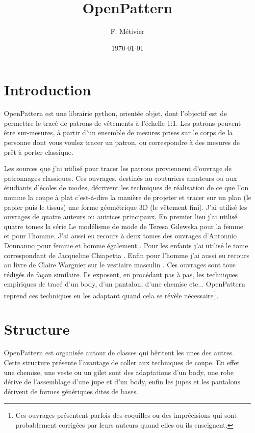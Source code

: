 \documentclass[11pt,a4paper]{article}
\begin{document}
\title{OpenPattern}
\author{F. Métivier}
\date{\today}
\maketitle

\tableofcontents


\section{Introduction}

OpenPattern  est une librairie python, orientée objet,  dont l'objectif est de permettre le tracé de patrons de vêtements à l'échelle 1:1. 
Les patrons peuvent être sur-mesures, à  partir d'un ensemble de mesures prises sur le corps de la personne dont vous voulez tracer un patron, ou
correspondre à des mesures de prêt à porter classique. 
 
Les sources que j'ai utilisé pour tracer les patrons proviennent d'ouvrage de patronnages classiques. Ces ouvrages, destinés au couturiers amateurs ou aux étudiants d'écoles de modes, décrivent les techniques de réalisation de ce que l'on nomme la coupe à plat c'est-à-dire  la manière de projeter et tracer sur un plan (le papier puis le tissus) une forme géométrique 3D (le vêtement fini). J'ai utilisé les ouvrages de quatre auteurs ou autrices principaux. 
En premier lieu j'ai utilisé quatre tomes la série Le modélisme de mode de Teresa Gilewska pour la femme et pour l'homme\cite{Gilewska1,Gilewska2,Gilewska4,Gilewska5}. J'ai aussi eu recours à deux tomes des ouvrages d'Antonnio Donnanno pour femme et homme également \cite{Donnanno2005,Donnanno2016}. Pour les enfants j'ai utilisé le tome correspondant de Jacqueline Chiapetta  \cite{Chiappetta1999}. Enfin pour l'homme j'ai aussi eu recours au livre de  Claire Wargnier sur le vestiaire masculin \cite{wargnier2012}. Ces ouvrages sont tous rédigés de façon similaire. Ils exposent, en procédant pas à pas, les techniques empiriques de tracé d'un body, d'un pantalon, d'une chemise etc...
OpenPattern reprend ces techniques en les adaptant quand cela se révèle nécessaire\footnote{Ces ouvrages présentent parfois des coquilles ou des imprécisions qui  sont probablement corrigées par leurs auteurs quand elles ou ils enseignent.}.

\section{Structure}

OpenPattern est organisée autour de classes qui héritent les unes des autres. Cette structure présente l'avantage de coller aux techniques de coupe. En effet une chemise, une veste ou un gilet sont des adaptations d'un body, une robe dérive de l'assemblage d'une jupe et d'un body, enfin les jupes et les pantalons dérivent de formes génériques dites de bases.
\end{document}
